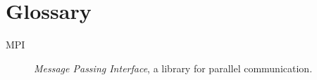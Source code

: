\section{Glossary}

\begin{description}

\item [MPI] \label{glos:MPI} {\it Message Passing Interface}, a library for parallel 
communication.

\end{description}











